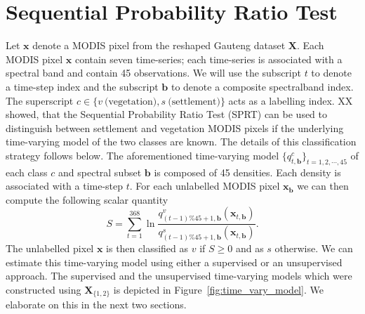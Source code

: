 \documentclass{article}
\begin{document}
\section{Sequential Probability Ratio Test}
Let $\mathbf{x}$ denote a MODIS pixel from the reshaped Gauteng dataset $\mathbf{X}$. Each MODIS pixel $\mathbf{x}$ contain seven time-series; each time-series is associated with a spectral band and contain 45 observations.
We will use the subscript $t$ to denote a time-step index and the subscript $\mathbf{b}$ to denote a composite spectralband index. The superscript $c\in\{v~\textrm{(vegetation)},s~\textrm{(settlement)}\}$ acts as a labelling index. XX showed, that the Sequential Probability Ratio Test (SPRT) can be used to distinguish between settlement and vegetation MODIS pixels if the underlying time-varying model of the two classes are known. The details of this classification strategy follows below. The aforementioned time-varying model $\{q_{t,\mathbf{b}}^c\}_{t=1,2,\cdots,45}$ of each class $c$ and spectral subset $\mathbf{b}$ is composed of 45 densities. Each density is associated with a time-step $t$. 
For each unlabelled MODIS pixel $\mathbf{x}_{\mathbf{b}}$ we can then compute the following scalar quantity 
\begin{equation}
S = \sum_{t=1}^{368} \ln \frac{q_{(t-1)\%45+1,\mathbf{b}}^v(\mathbf{x}_{t,\mathbf{b}})}{q_{(t-1)\%45+1,\mathbf{b}}^s(\mathbf{x}_{t,\mathbf{b}})}. 
\end{equation}
The unlabelled pixel $\mathbf{x}$ is then classified as $v$ if $S\geq 0$ and as $s$ otherwise. We can estimate this time-varying model using either a supervised or an unsupervised 
approach. The supervised and the unsupervised time-varying models which were constructed using $\mathbf{X}_{\{1,2\}}$ is depicted in Figure~\ref{fig:time_vary_model}. We elaborate on this in the next two sections.
\end{document}

